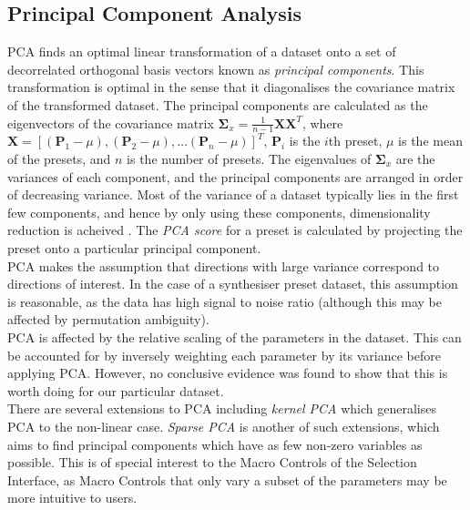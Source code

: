 \documentclass[11pt, oneside]{report}   	%
\renewcommand{\vec}[1]{\mathbf{#1}}
\begin{document}
\subsection{Principal Component Analysis}\label{sec:PCA}
PCA finds an optimal linear transformation of a dataset onto a set of decorrelated orthogonal basis vectors known as \emph{principal components}. This transformation is optimal in the sense that it diagonalises the covariance matrix of the transformed dataset. 
The principal components are calculated as the eigenvectors of the covariance matrix $\vec{\Sigma}_x = \frac{1}{n-1}\vec{X}\vec{X}^T$, where $\vec{X} = [(\vec{P}_1-\mu), (\vec{P}_2-\mu), \dots (\vec{P}_n-\mu)]^T$, $\vec{P}_i$ is the $i$th preset, $\mu$ is the mean of the presets, and $n$ is the number of presets.
The eigenvalues of $\vec{\Sigma}_x$ are the variances of each component, and the principal components are arranged in order of decreasing variance.
Most of the variance of a dataset typically lies in the first few components, and hence by only using these components, dimensionality reduction is acheived \cite{PCA}. The \emph{PCA score} for a preset is calculated by projecting the preset onto a particular principal component.\\
PCA makes the assumption that directions with large variance correspond to directions of interest. In the case of a synthesiser preset dataset, this assumption is reasonable, as the data has high signal to noise ratio (although this may be affected by permutation ambiguity).\\
PCA is affected by the relative scaling of the parameters in the dataset. This can be accounted for by inversely weighting each parameter by its variance before applying PCA. However, no conclusive evidence was found to show that this is worth doing for our particular dataset.\\
There are several extensions to PCA including \emph{kernel PCA} which generalises PCA to the non-linear case. \emph{Sparse PCA} is another of such extensions, which aims to find principal components which have as few non-zero variables as possible. This is of special interest to the Macro Controls of the Selection Interface, as Macro Controls that only vary a subset of the parameters may be more intuitive to users.
\end{document}
